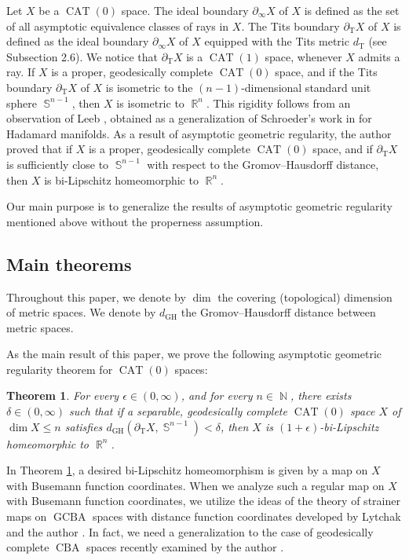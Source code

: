 \documentclass[a4paper,12pt]{amsart}
\newcommand{\CAT}{\operatorname{CAT}}
\newcommand{\CBA}{\operatorname{CBA}}
\newcommand{\GCBA}{\operatorname{GCBA}}
\newcommand{\R}{\operatorname{\mathbb{R}}}
\newcommand{\N}{\operatorname{\mathbb{N}}}
\newcommand{\Sph}{\operatorname{\mathbb{S}}}
\newcommand{\GH}{\operatorname{\mathrm{GH}}}
\newcommand{\T}{\operatorname{\mathrm{T}}}
\numberwithin{equation}{section}
\theoremstyle{plain}
\newtheorem{thm}{Theorem}[section]
\theoremstyle{definition}
\theoremstyle{remark}
\begin{document}
Let $X$ be a $\CAT(0)$ space.
The ideal boundary $\partial_{\infty}X$ of $X$ is defined as 
the set of all asymptotic equivalence classes of rays in $X$.
The Tits boundary $\partial_{\mathrm{T}}X$ of $X$
is defined as
the ideal boundary $\partial_{\infty}X$ of $X$ equipped with
the Tits metric $d_{\mathrm{T}}$
(see Subsection 2.6).
We notice that $\partial_{\mathrm{T}}X$ is a $\CAT(1)$ space, 
whenever $X$ admits a ray.
If $X$ is a proper, geodesically complete $\CAT(0)$ space, 
and if the Tits boundary $\partial_{\mathrm{T}}X$ of $X$ is isometric to 
the $(n-1)$-dimensional standard unit sphere $\Sph^{n-1}$, 
then $X$ is isometric to $\R^n$. 
This rigidity follows from an observation of Leeb \cite[Proposition 2.1]{leeb}, obtained as a generalization of Schroeder's work 
in \cite[Appendix 4]{ballmann-gromov-schroeder} for Hadamard manifolds.
As a result of asymptotic geometric regularity,
the author \cite[Theorems 5.10 and 5.11]{nagano5} proved 
that 
if $X$ is a proper, geodesically complete $\CAT(0)$ space, 
and if $\partial_{\T}X$
is sufficiently close to $\Sph^{n-1}$
with respect to the Gromov--Hausdorff distance,
then $X$ is bi-Lipschitz homeomorphic to $\R^n$.

Our main purpose is
to generalize the results of asymptotic geometric regularity
mentioned above
without the properness assumption.

\subsection{Main theorems}

Throughout this paper,
we denote by $\dim$ 
the covering (topological) dimension of metric spaces.
We denote by $d_{\GH}$ 
the Gromov--Hausdorff distance between metric spaces.

As the main result of this paper,
we prove the following asymptotic geometric regularity theorem
for $\CAT(0)$ spaces:

\begin{thm}
\label{thm: agrcat0}
For every $\epsilon \in (0,\infty)$,
and for every $n \in \N$,
there exists $\delta \in (0,\infty)$ such that
if a separable, geodesically complete $\CAT(0)$ space $X$
of $\dim X \le n$
satisfies
$d_{\GH} \left( \partial_{\mathrm{T}}X, \Sph^{n-1} \right) < \delta$,
then $X$ is $(1+\epsilon)$-bi-Lipschitz homeomorphic to $\R^n$.
\end{thm}

In Theorem \ref{thm: agrcat0},
a desired bi-Lipschitz homeomorphism 
is given by a map on $X$ with Busemann function coordinates.
When we analyze such a regular map on $X$ 
with Busemann function coordinates,
we utilize the ideas of the theory 
of strainer maps on $\GCBA$ spaces 
with distance function coordinates
developed by 
Lytchak and the author \cite{lytchak-nagano1}.
In fact,
we need a generalization to 
the case of geodesically complete $\CBA$ spaces 
recently examined by the author \cite{nagano6}.
\end{document}
